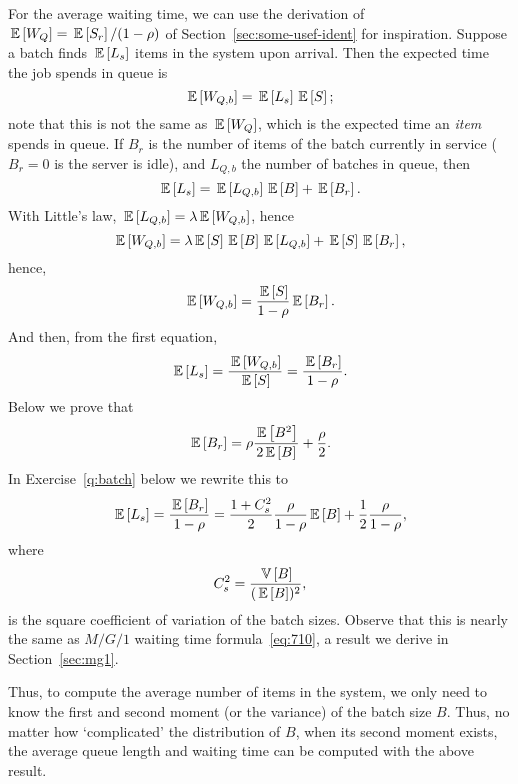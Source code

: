 For the average waiting time, we can use the derivation of
$\,\mathbb{E}\left[W_Q\right]=\,\mathbb{E}\left[S_r\right]/(1-\rho)$ of Section~\ref{sec:some-usef-ident} for
inspiration. Suppose a batch finds $\,\mathbb{E}\left[L_s\right]$ items in the system upon
arrival. Then the expected time the job spends in queue is
\begin{equation*}
  \,\mathbb{E}\left[W_{Q,b}\right] = \,\mathbb{E}\left[L_s\right] \,\mathbb{E}\left[S\right];
\end{equation*}
note that this is not the same as $\,\mathbb{E}\left[W_Q\right]$, which is the expected
time an \emph{item} spends in queue.  If $B_r$ is the number of items
of the batch currently in service ($B_r=0$ is the server is idle), and
$L_{Q,b}$ the number of batches in queue, then
\begin{equation*}
  \,\mathbb{E}\left[L_s\right] = \,\mathbb{E}\left[L_{Q,b}\right]\,\mathbb{E}\left[B\right] + \,\mathbb{E}\left[B_r\right].
\end{equation*}
With  Little's law, $\,\mathbb{E}\left[L_{Q,b}\right] = \lambda \,\mathbb{E}\left[W_{Q,b}\right]$, hence
\begin{equation*}
  \,\mathbb{E}\left[W_{Q,b}\right] = \lambda \,\mathbb{E}\left[S\right] \,\mathbb{E}\left[B\right] \,\mathbb{E}\left[L_{Q,b}\right] + \,\mathbb{E}\left[S\right] \,\mathbb{E}\left[B_r\right],
\end{equation*}
hence,
\begin{equation*}
  \,\mathbb{E}\left[W_{Q,b}\right] = \frac{\,\mathbb{E}\left[S\right]}{1-\rho}\,\mathbb{E}\left[B_r\right].
\end{equation*}
And then, from the first equation, 
\begin{equation*}
  \,\mathbb{E}\left[L_s\right] = \frac{\,\mathbb{E}\left[W_{Q,b}\right]}{\,\mathbb{E}\left[S\right]} = \frac{\,\mathbb{E}\left[B_r\right]}{1-\rho}.
\end{equation*}
Below we prove that 
\begin{equation}\label{eq:br}
  \,\mathbb{E}\left[B_r\right] = \rho\frac{\,\mathbb{E}\left[B^2\right]}{2\,\mathbb{E}\left[B\right]} + \frac\rho2.
\end{equation}
In Exercise~\ref{q:batch} below we rewrite this to
\begin{equation}\label{eq:43}
\,\mathbb{E}\left[L_s\right]  = \frac{\,\mathbb{E}\left[B_r\right]}{1-\rho} = \frac{1+C_s^2}2 \frac{\rho}{1-\rho} \,\mathbb{E}\left[B\right] + \frac12\frac\rho{1-\rho},
\end{equation}
where
\begin{equation*}
C_s^2 = \frac{\,\mathbb{V}\left[B\right]}{(\,\mathbb{E}\left[B\right])^2},
\end{equation*}
is the square coefficient of variation of the batch sizes.  Observe
that this is nearly the same as $M/G/1$ waiting time
formula~\ref{eq:710}, a result we derive in Section~\ref{sec:mg1}. 

Thus, to compute the average number of items in the system, we only
need to know the first and second moment (or the variance) of the
batch size $B$. Thus, no matter how `complicated' the distribution of
$B$, when its second moment exists, the average queue length and
waiting time can be computed with the above result. 



